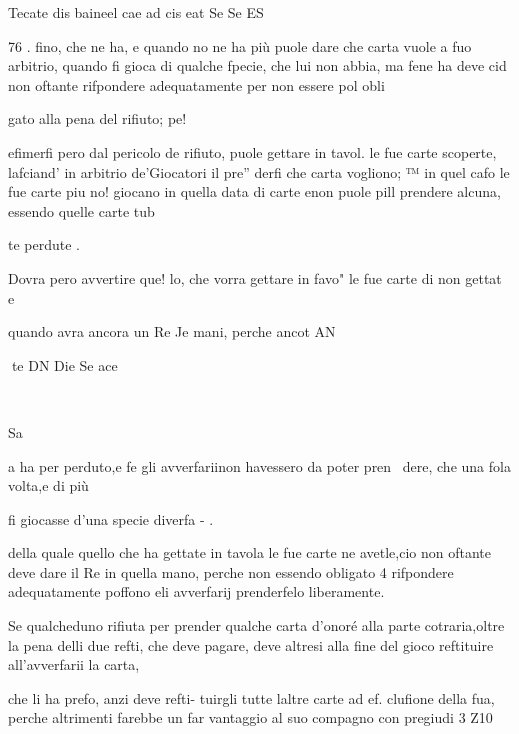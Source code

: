 \documentclass[12pt,a6paper]{article}
\begin{document}
 

Tecate dis baineel cae ad cis eat Se Se ES

 

 
 

 

 

 

 

76 .
fino, che ne ha, e quando no
ne ha più puole dare che carta
vuole a fuo arbitrio, quando fi
gioca di qualche fpecie, che lui
non abbia, ma fene ha deve cid
non oftante rifpondere adequatamente per non essere pol obli

gato alla pena del rifiuto; pe!

efimerfi pero dal pericolo de
rifiuto, puole gettare in tavol.
le fue carte scoperte, lafciand'
in arbitrio de’Giocatori il pre”
derfi che carta vogliono; ™
in quel cafo le fue carte piu no!
giocano in quella data di carte
enon puole pill prendere
alcuna, essendo quelle carte tub

te perdute .

Dovra pero avvertire que!
lo, che vorra gettare in favo"
le fue carte di non gettat e

quando avra ancora un Re
Je mani, perche ancot AN

 
te DN Die Se ace

~

Sa

 

 

a
ha per perduto,e fe gli avverfariinon havessero da poter pren~
dere, che una fola volta,e di più

fi giocasse d’una specie diverfa - .

della quale quello che ha gettate in tavola le fue carte ne
avetle,cio non oftante deve dare il Re in quella mano, perche
non essendo obligato 4 rifpondere adequatamente poffono eli
avverfarij prenderfelo liberamente.

Se qualcheduno rifiuta per
prender qualche carta d’onoré
alla parte cotraria,oltre la pena
delli due refti, che deve pagare,
deve altresi alla fine del gioco
reftituire all’avverfarii la carta,

che li ha prefo, anzi deve refti- 
tuirgli tutte laltre carte ad ef.
clufione della fua, perche altrimenti farebbe un far vantaggio
al suo compagno con pregiudi
3 Z10

 

 

 
\end{document}
